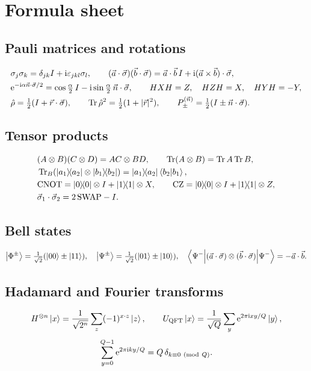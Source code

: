 \chapter{Formula sheet}\label{app:formulas}

\section*{Pauli matrices and rotations}
\begin{align*}
  &\sigma_j\sigma_k=\delta_{jk}I+\mathrm i\varepsilon_{jkl}\sigma_l,\qquad(\vec a\cdot\vec\sigma)(\vec b\cdot\vec\sigma)=\vec a\cdot\vec b\,I+\mathrm i(\vec a\times\vec b)\cdot\vec\sigma,\\
  &\mathrm e^{-\mathrm i\alpha\vec n\cdot\vec\sigma/2}=\cos\tfrac\alpha2\,I-\mathrm i\sin\tfrac\alpha2\,\vec n\cdot\vec\sigma,\qquad HXH=Z,\quad HZH=X,\quad HYH=-Y,\\
  &\hat\rho=\tfrac12(I+\vec r\cdot\vec\sigma),\qquad\operatorname{Tr}\hat\rho^2=\tfrac12(1+|\vec r|^2),\qquad P_\pm^{(\vec n)}=\tfrac12(I\pm\vec n\cdot\vec\sigma).
\end{align*}

\section*{Tensor products}
\begin{align*}
  &(A\otimes B)(C\otimes D)=AC\otimes BD,\qquad\operatorname{Tr}(A\otimes B)=\operatorname{Tr} A\operatorname{Tr} B,\\ &\operatorname{Tr}_B(\left|a_1\middle\rangle\!\middle\langle a_2\right|\otimes\left|b_1\middle\rangle\!\middle\langle b_2\right|)=\left|a_1\middle\rangle\!\middle\langle a_2\right|\left\langle b_2\middle|b_1\right\rangle,\\
  &\mathrm{CNOT}=\left|0\middle\rangle\!\middle\langle0\right|\otimes I+\left|1\middle\rangle\!\middle\langle1\right|\otimes X,\qquad\mathrm{CZ}=\left|0\middle\rangle\!\middle\langle0\right|\otimes I+\left|1\middle\rangle\!\middle\langle1\right|\otimes Z,\\ &\vec\sigma_1\cdot\vec\sigma_2=2\,\mathrm{SWAP}-I.
\end{align*}

\section*{Bell states}
\[
  \left|\Phi^\pm\right\rangle=\tfrac1{\sqrt2}(\left|00\right\rangle\pm\left|11\right\rangle),\quad\left|\Psi^\pm\right\rangle=\tfrac1{\sqrt2}(\left|01\right\rangle\pm\left|10\right\rangle),\quad
  \left\langle\Psi^-\middle|(\vec a\cdot\vec\sigma)\otimes(\vec b\cdot\vec\sigma)\middle|\Psi^-\right\rangle=-\vec a\cdot\vec b .
\]

\section*{Hadamard and Fourier transforms}
\[
  H^{\otimes n}\left|x\right\rangle=\frac1{\sqrt{2^n}}\sum_z(-1)^{x\cdot z}\left|z\right\rangle,\qquad U_{\rm QFT}\left|x\right\rangle=\frac1{\sqrt Q}\sum_y\mathrm e^{2\pi\mathrm i xy/Q}\left|y\right\rangle,\]
\[
  \sum_{y=0}^{Q-1}\mathrm e^{2\pi\mathrm i ky/Q}=Q\,\delta_{k\equiv0\ (\mathrm{mod}\ Q)} .
\]

